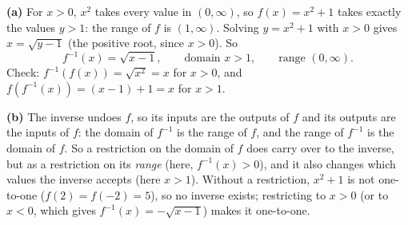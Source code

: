 \textbf{(a)} For $x>0$, $x^2$ takes every value in $(0,\infty)$, so $f(x)=x^2+1$ takes exactly the values $y>1$: the range of $f$ is $(1,\infty)$. Solving $y=x^2+1$ with $x>0$ gives $x=\sqrt{y-1}$ (the positive root, since $x>0$). So
\[
f^{-1}(x)=\sqrt{x-1},\qquad\text{domain }x>1,\qquad\text{range }(0,\infty).
\]
Check: $f^{-1}(f(x))=\sqrt{x^2}=x$ for $x>0$, and $f(f^{-1}(x))=(x-1)+1=x$ for $x>1$.

\textbf{(b)} The inverse undoes $f$, so its inputs are the outputs of $f$ and its outputs are the inputs of $f$: the domain of $f^{-1}$ is the range of $f$, and the range of $f^{-1}$ is the domain of $f$. So a restriction on the domain of $f$ does carry over to the inverse, but as a restriction on its \emph{range} (here, $f^{-1}(x)>0$), and it also changes which values the inverse accepts (here $x>1$). Without a restriction, $x^2+1$ is not one-to-one ($f(2)=f(-2)=5$), so no inverse exists; restricting to $x>0$ (or to $x<0$, which gives $f^{-1}(x)=-\sqrt{x-1}$) makes it one-to-one.

